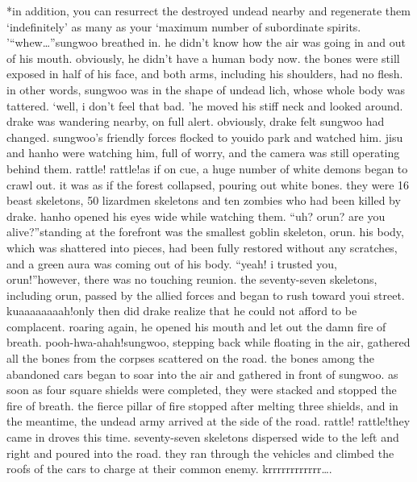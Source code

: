 *in addition, you can resurrect the destroyed undead nearby and regenerate them ‘indefinitely’ as many as your ‘maximum number of subordinate spirits.
’“whew…”sungwoo breathed in.
 he didn’t know how the air was going in and out of his mouth.
 obviously, he didn’t have a human body now.
the bones were still exposed in half of his face, and both arms, including his shoulders, had no flesh.
 in other words, sungwoo was in the shape of undead lich, whose whole body was tattered.
‘well, i don’t feel that bad.
’he moved his stiff neck and looked around.
 drake was wandering nearby, on full alert.
obviously, drake felt sungwoo had changed.
sungwoo’s friendly forces flocked to youido park and watched him.
 jisu and hanho were watching him, full of worry, and the camera was still operating behind them.
rattle! rattle!as if on cue, a huge number of white demons began to crawl out.
 it was as if the forest collapsed, pouring out white bones.
they were 16 beast skeletons, 50 lizardmen skeletons and ten zombies who had been killed by drake.
 hanho opened his eyes wide while watching them.
“uh? orun? are you alive?”standing at the forefront was the smallest goblin skeleton, orun.
his body, which was shattered into pieces, had been fully restored without any scratches, and a green aura was coming out of his body.
“yeah! i trusted you, orun!”however, there was no touching reunion.
 the seventy-seven skeletons, including orun, passed by the allied forces and began to rush toward youi street.
kuaaaaaaaah!only then did drake realize that he could not afford to be complacent.
 roaring again, he opened his mouth and let out the damn fire of breath.
pooh-hwa-ahah!sungwoo, stepping back while floating in the air, gathered all the bones from the corpses scattered on the road.
 the bones among the abandoned cars began to soar into the air and gathered in front of sungwoo.
as soon as four square shields were completed, they were stacked and stopped the fire of breath.
 the fierce pillar of fire stopped after melting three shields, and in the meantime, the undead army arrived at the side of the road.
rattle! rattle!they came in droves this time.
 seventy-seven skeletons dispersed wide to the left and right and poured into the road.
 they ran through the vehicles and climbed the roofs of the cars to charge at their common enemy.
krrrrrrrrrrrr….


 